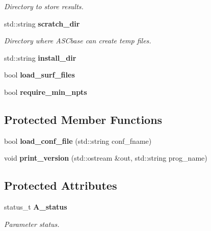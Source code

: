 \begin{CompactItemize}
\begin{CompactList}\small\item\em Directory to store results. \item\end{CompactList}\item 
std::string \bf{scratch\_\-dir}\label{classASCbase_1_1BaseParameters_96aa06a7fff08e400ec92d0ada56b786}

\begin{CompactList}\small\item\em Directory where ASCbase can create temp files. \item\end{CompactList}\item 
std::string \textbf{install\_\-dir}\label{classASCbase_1_1BaseParameters_6fc273afb61ac03e5e733e704b9003d5}

\item 
bool \textbf{load\_\-surf\_\-files}\label{classASCbase_1_1BaseParameters_dd007d2ec07c2f19ed5eb847cede37e7}

\item 
bool \textbf{require\_\-min\_\-npts}\label{classASCbase_1_1BaseParameters_2cbb07424c917a0593f1d40ea08bec81}

\end{CompactItemize}
\subsection*{Protected Member Functions}
\begin{CompactItemize}
\item 
bool \textbf{load\_\-conf\_\-file} (std::string conf\_\-fname)\label{classASCbase_1_1BaseParameters_0bb99f45e58ded09c08f202dc662fb2c}

\item 
void \textbf{print\_\-version} (std::ostream \&out, std::string prog\_\-name)\label{classASCbase_1_1BaseParameters_dd81fff1ee86b790d0ee408cf3834116}

\end{CompactItemize}
\subsection*{Protected Attributes}
\begin{CompactItemize}
\item 
status\_\-t \bf{A\_\-status}\label{classASCbase_1_1BaseParameters_552075c2455c9ce279594f9d620de06a}

\begin{CompactList}\small\item\em Parameter status. \item\end{CompactList}\end{CompactItemize}
